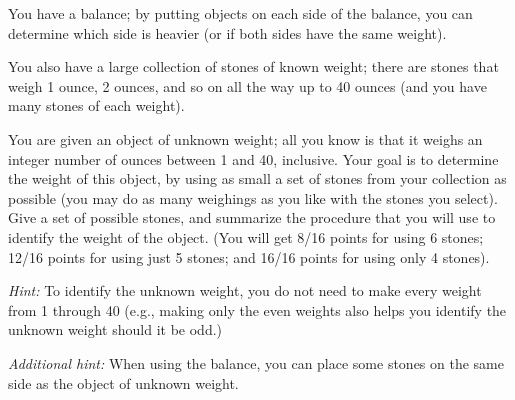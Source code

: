 \documentclass[twoside,12pt]{article}
\begin{document}
\begin{problem}{16} You have a balance; by putting objects on each side of the balance, you 
can determine which side is heavier (or if both sides have the same weight).  

You also have a large collection of stones of known weight; there are stones that weigh 1 ounce, 
2 ounces, and so on all the way up to 40 ounces (and you have many stones of each weight).

You are given an object of unknown weight; all you know is that it weighs an integer number of 
ounces between 1 and 40, inclusive.  Your goal is to determine the weight of this object, by 
using as small a set of stones from your collection as possible (you may do as many weighings 
as you like with the stones you select).  Give a set of possible stones, and summarize the procedure 
that you will use to identify the weight of the object.  (You will get 8/16 points for using 6 stones; 
12/16 points for using just 5 stones; and 16/16 points for using only 4 stones).

\textit{Hint:}   To identify the unknown weight, you do not need to make every weight from 1 through 40 (e.g., 
making only the even weights also helps you identify the unknown weight should it be odd.)

\textit{Additional hint:}   When using the balance, you can place some stones on the same side as the object of unknown weight.

\end{problem}
\end{document}

